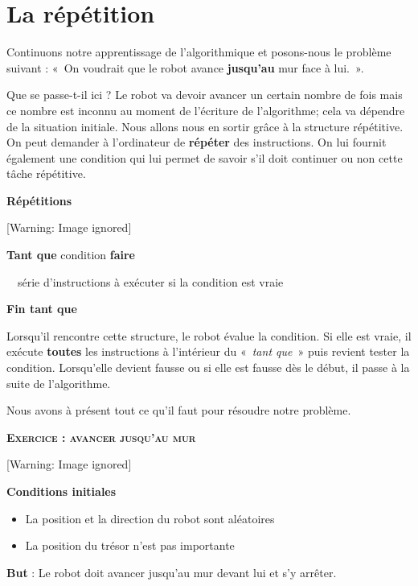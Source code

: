 \section{La répétition}
{
Continuons notre apprentissage de l'algorithmique et
posons-nous le problème suivant : «~On voudrait que le robot avance
\textbf{jusqu'au} mur face à lui.~».}

{
Que se passe-t-il ici ? Le robot va devoir avancer un certain nombre de
fois mais ce nombre est inconnu au moment de
l'écriture de l'algorithme; cela va
dépendre de la situation initiale. Nous allons nous en sortir grâce à
la structure répétitive. On peut demander à
l'ordinateur de \textbf{répéter} des instructions. On
lui fournit également une condition qui lui permet de savoir
s'il doit continuer ou non cette tâche répétitive.}

{\bfseries
Répétitions}

\begin{center}
 [Warning: Image ignored] %

\end{center}
{\sffamily
\textbf{Tant que} condition \textbf{faire}}

{\sffamily
\ \ série d'instructions à exécuter si la condition est
vraie}

{\sffamily\bfseries
Fin tant que}

{
Lorsqu'il rencontre cette structure, le robot évalue la
condition. Si elle est vraie, il exécute \textbf{toutes} les
instructions à l'intérieur du «~\textit{tant que~}»
puis revient tester la condition. Lorsqu'elle devient
fausse ou si elle est fausse dès le début, il passe à la suite de
l'algorithme.}

{
Nous avons à présent tout ce qu'il faut pour résoudre
notre problème.}

{\sffamily\bfseries\scshape
Exercice : avancer jusqu'au mur}

\begin{center}
 [Warning: Image ignored] %

\end{center}
{\bfseries
Conditions initiales}

\liststyleListv
\begin{itemize}
\item {
La position et la direction du robot sont aléatoires}
\item {
La position du trésor n'est pas importante}
\end{itemize}
{
\textbf{But} : Le robot doit avancer jusqu'au mur
devant lui et s'y arrêter.}

